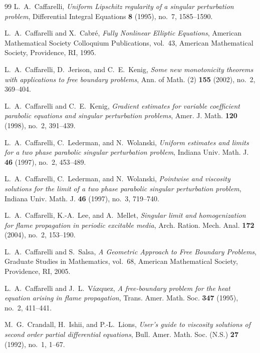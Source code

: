 \documentclass[11pt,letterpaper]{amsart}
\numberwithin{equation}{section}
\theoremstyle{definition}
\theoremstyle{remark}
\begin{document}
\begin{thebibliography}{99}
L.~A.~Caffarelli,
\emph{Uniform Lipschitz regularity of a singular perturbation problem},
Differential Integral Equations \textbf{8} (1995), no.~7, 1585--1590.

L.~A.~Caffarelli and X.~Cabr\'e,
\emph{Fully Nonlinear Elliptic Equations},
American Mathematical Society Colloquium Publications, vol.~43,
American Mathematical Society, Providence, RI, 1995.

L.~A.~Caffarelli, D.~Jerison, and C.~E.~Kenig,
\emph{Some new monotonicity theorems with applications to free boundary
problems},
Ann. of Math. (2) \textbf{155} (2002), no.~2, 369--404.

L.~A.~Caffarelli and C.~E.~Kenig,
\emph{Gradient estimates for variable coefficient parabolic equations and
singular perturbation problems},
Amer. J. Math. \textbf{120} (1998), no.~2, 391--439.

L.~A.~Caffarelli, C.~Lederman, and N.~Wolanski,
\emph{Uniform estimates and limits for a two phase parabolic singular
perturbation problem},
Indiana Univ. Math. J. \textbf{46} (1997), no.~2, 453--489.

L.~A.~Caffarelli, C.~Lederman, and N.~Wolanski,
\emph{Pointwise and viscosity solutions for the limit of a two phase
parabolic singular perturbation problem},
Indiana Univ. Math. J. \textbf{46} (1997), no.~3, 719--740.

L.~A.~Caffarelli, K.-A.~Lee, and A.~Mellet,
\emph{Singular limit and homogenization for flame propagation in periodic
excitable media},
Arch. Ration. Mech. Anal. \textbf{172} (2004), no.~2, 153--190.

L.~A.~Caffarelli and S.~Salsa,
\emph{A Geometric Approach to Free Boundary Problems},
Graduate Studies in Mathematics, vol.~68,
American Mathematical Society, Providence, RI, 2005.

L.~A.~Caffarelli and J.~L.~V\'azquez,
\emph{A free-boundary problem for the heat equation arising in flame
propagation},
Trans. Amer. Math. Soc. \textbf{347} (1995), no.~2, 411--441.

M.~G.~Crandall, H.~Ishii, and P.-L.~Lions,
\emph{User's guide to viscosity solutions of second order partial differential
equations},
Bull. Amer. Math. Soc. (N.S.) \textbf{27} (1992), no.~1, 1--67.


\end{thebibliography}
\end{document}
